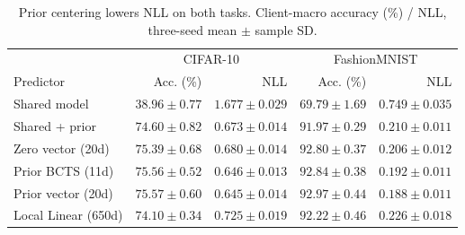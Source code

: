 \begin{table}[!htb]
\centering\small
\setlength{\tabcolsep}{5pt}
\caption{Prior centering lowers NLL on both tasks. Client-macro accuracy (\%) / NLL, three-seed mean $\pm$ sample SD.}\label{tab:main}
\begin{tabular}{lrrrr}\toprule
& \multicolumn{2}{c}{CIFAR-10} & \multicolumn{2}{c}{FashionMNIST}\\
Predictor & Acc. (\%) & NLL & Acc. (\%) & NLL\\\midrule
Shared model & $38.96\pm0.77$ & $1.677\pm0.029$ & $69.79\pm1.69$ & $0.749\pm0.035$\\
Shared + prior & $74.60\pm0.82$ & $0.673\pm0.014$ & $91.97\pm0.29$ & $0.210\pm0.011$\\
Zero vector (20d) & $75.39\pm0.68$ & $0.680\pm0.014$ & $92.80\pm0.37$ & $0.206\pm0.012$\\
Prior BCTS (11d) & $75.56\pm0.52$ & $0.646\pm0.013$ & $92.84\pm0.38$ & $0.192\pm0.011$\\
Prior vector (20d) & $75.57\pm0.60$ & $0.645\pm0.014$ & $92.97\pm0.44$ & $0.188\pm0.011$\\
Local Linear (650d) & $74.10\pm0.34$ & $0.725\pm0.019$ & $92.22\pm0.46$ & $0.226\pm0.018$\\
\bottomrule
\end{tabular}
\end{table}
